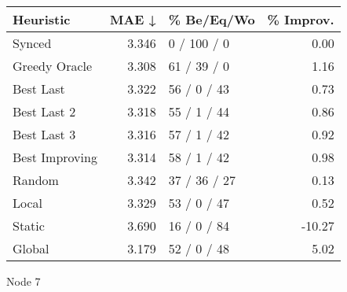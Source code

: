 \begin{tabular}{lrlr}
\toprule
\textbf{Heuristic} & \textbf{MAE ↓} & \textbf{\% Be/Eq/Wo} & \textbf{\% Improv.} \\
\midrule
            Synced &          3.346 &          0 / 100 / 0 &                0.00 \\
     Greedy Oracle &          3.308 &          61 / 39 / 0 &                1.16 \\
         Best Last &          3.322 &          56 / 0 / 43 &                0.73 \\
       Best Last 2 &          3.318 &          55 / 1 / 44 &                0.86 \\
       Best Last 3 &          3.316 &          57 / 1 / 42 &                0.92 \\
    Best Improving &          3.314 &          58 / 1 / 42 &                0.98 \\
            Random &          3.342 &         37 / 36 / 27 &                0.13 \\
             Local &          3.329 &          53 / 0 / 47 &                0.52 \\
            Static &          3.690 &          16 / 0 / 84 &              -10.27 \\
            Global &          3.179 &          52 / 0 / 48 &                5.02 \\
\bottomrule
\end{tabular}
\caption{Node 7}
\label{tab:ds_iid_lr01_le1_bs4_7}
